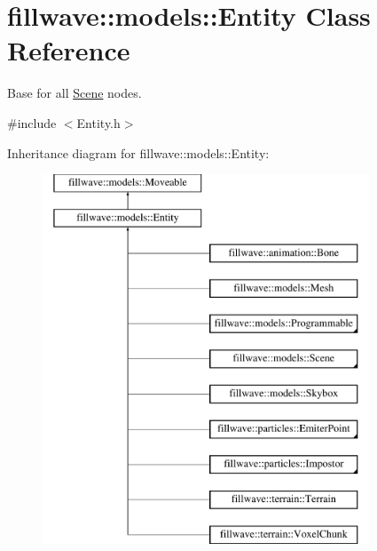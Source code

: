 \hypertarget{classfillwave_1_1models_1_1Entity}{}\section{fillwave\+:\+:models\+:\+:Entity Class Reference}
\label{classfillwave_1_1models_1_1Entity}


Base for all \hyperlink{classfillwave_1_1models_1_1Scene}{Scene} nodes.  




{\ttfamily \#include $<$Entity.\+h$>$}

Inheritance diagram for fillwave\+:\+:models\+:\+:Entity\+:\begin{figure}[H]
\begin{center}
\leavevmode
\includegraphics[height=11.000000cm]{classfillwave_1_1models_1_1Entity}
\end{center}
\end{figure}
